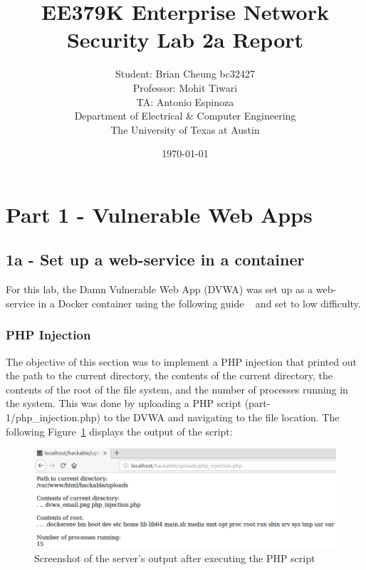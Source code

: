 \documentclass[11pt]{article}
\author{Student: Brian Cheung bc32427 \\ Professor: Mohit Tiwari \\ TA: Antonio Espinoza \\ Department of Electrical \& Computer Engineering \\ The University of Texas at Austin}
\date{\today}
\title{EE379K Enterprise Network Security Lab 2a Report}
\begin{document}
\maketitle
\newpage
\section*{Part 1 - Vulnerable Web Apps}
\label{sec:part-1}
\subsection*{1a - Set up a web-service in a container}
For this lab, the Damn Vulnerable Web App (DVWA) was set up as a web-service in a Docker container
using the following guide ~\cite{dvwa} and set to low difficulty.

\subsubsection*{PHP Injection}
The objective of this section was to implement a PHP injection that printed out the path to the current directory,
the contents of the current directory, the contents of the root of the file system, and the number of processes running in the system.
This was done by uploading a PHP script (part-1/php\_injection.php) to the DVWA and navigating to the file location.
The following Figure~\ref{fig:php-injection} displays the output of the script:
\begin{figure}[htbp]
  \centering
  \includegraphics[width=.9\linewidth]{./php-injection.png}
  \caption{\label{fig:php-injection}
  Screenshot of the server's output after executing the PHP script}
\end{figure}
\end{document}
